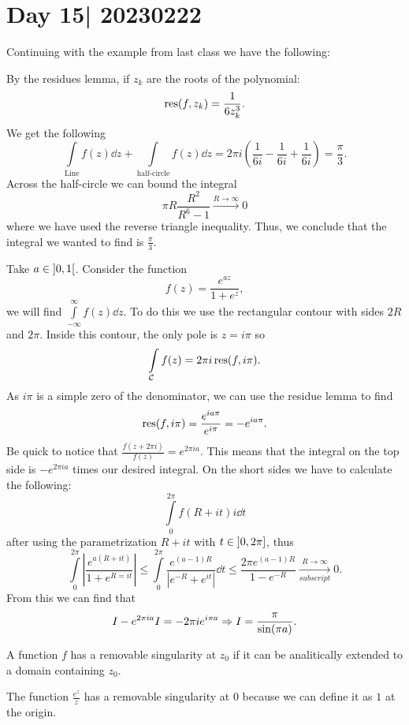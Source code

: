 \documentclass[12pt]{memoir}
\begin{document}
\section{Day 15| 20230222}

Continuing with the example from last class we have the following:

\begin{ptcb}
    By the residues lemma, if $z_k$ are the roots of the polynomial:
    $$\operatorname*{res}(f,z_k)=\frac{1}{6z_k^3}.$$
    We get the following 
    $$\int\limits_{\text{Line}}f(z)\dd z+\int\limits_{\text{half-circle}}f(z)\dd z=2\pi i\left(\frac{1}{6i}-\frac{1}{6i}+\frac{1}{6i}\right)=\frac{\pi}{3}.$$
    Across the half-circle we can bound the integral 
    $$\pi R\frac{R^2}{R^6-1}\xrightarrow[]{R\to\infty
    }0$$
    where we have used the reverse triangle inequality. Thus, we conclude that the integral we wanted to find is $\frac{\pi}{3}$.
\end{ptcb}

\begin{Ex}
    Take $a\in\left\rbrack0,1\right\lbrack$. Consider the function 
    $$f(z)=\frac{e^{az}}{1+e^z},$$
    we will find $\int\limits_{-\infty}^\infty f(z)\dd z$. To do this we use the rectangular contour with sides $2R$ and $2\pi$. Inside this contour, the only pole is $z=i\pi$ so 
    $$\int\limits_{\mathcal{C}}f(z)=2\pi i\operatorname*{res}(f,i\pi).$$
    As $i\pi$ is a simple zero of the denominator, we can use the residue lemma to find 
    $$\operatorname*{res}(f,i\pi)=\frac{e^{ia\pi}}{e^{i\pi}}=-e^{ia\pi}.$$
    Be quick to notice that $\frac{f(z+2\pi i)}{f(z)}=e^{2\pi i a}$. This means that the integral on the top side is $-e^{2\pi i a}$ times our desired integral. On the short sides we have to calculate the following:
    $$\int\limits_0^{2\pi}f(R+it)i\dd t$$
    after using the parametrization $R+it$ with $t\in\left\rbrack0,2\pi\right\rbrack$, thus 
    $$\int\limits_0^{2\pi}\left|\frac{e^{a(R+it)}}{1+e^{R=it}}\right|\leq\int\limits_0^{2\pi}\frac{e^{(a-1)R}}{|e^{-R}+e^{it}|}\dd t\leq\frac{2\pi e^{(a-1)R}}{1-e^{-R}}\xrightarrow[subscript]{R\to\infty
    }0.$$
    From this we can find that 
    $$I-e^{2\pi ia}I=-2\pi i e^{i\pi a}\Rightarrow I=\frac{\pi}{\sin(\pi a)}.$$
\end{Ex}

\begin{Def}
    A function $f$ has a removable singularity at $z_0$ if it can be analitically extended to a domain containing $z_0$.
\end{Def}

\begin{Ex}
    The function $\frac{e^z}{z}$ has a removable singularity at 0 because we can define it as $1$ at the origin.
\end{Ex}
\ifx\nextra\undefined
\printindex
\else\fi
\nocite{*}


\end{document}
